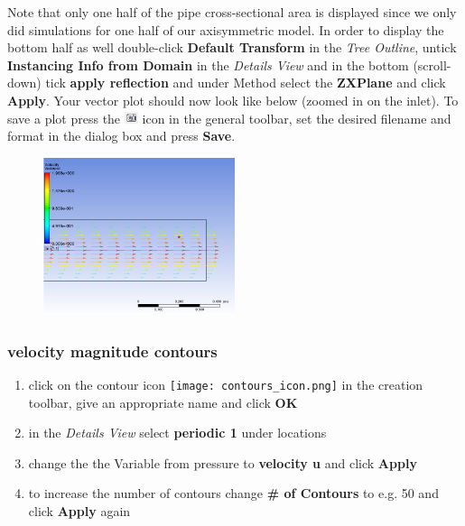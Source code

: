 \documentclass[11pt,a4paper,oneside]{scrartcl}
\newcommand\bfr[1]{\textcolor[rgb]{1,0.00,0.00}{\textbf{\textsf{#1}}}}
\begin{document}
Note that only one half of the pipe cross-sectional area is displayed since we only did simulations for one half of our axisymmetric model. In order to display the bottom half as well double-click \bfr{Default Transform} in the \emph{Tree Outline},  untick \bfr{Instancing Info from Domain} in the \emph{Details View} and in the bottom (scroll-down) tick \bfr{apply reflection} and under Method select the \bfr{ZXPlane} and click \bfr{Apply}. Your vector plot  should now look like below (zoomed in on the inlet). To save a plot press the \includegraphics[width=0.4cm]{save_picture_icon.png} icon in the general toolbar, set the desired filename and format in the dialog box and press \bfr{Save}.

\begin{figure}[H]
\begin{center}
\includegraphics[width=0.5\textwidth,clip]{vector_plot.png}
\end{center}
\end{figure}

\subsubsection{velocity magnitude contours}

\begin{enumerate}
\item click on the contour icon \texttt{[image: contours\_icon.png]} in the creation toolbar, give an appropriate name and click \bfr{OK}
\item in the \emph{Details View} select \bfr{periodic 1} under locations
\item change the the Variable from pressure to \bfr{velocity u} and click \bfr{Apply}
\item to increase the number of contours change \bfr{\# of Contours} to e.g. 50 and click \bfr{Apply} again
\end{enumerate}
\end{document}
